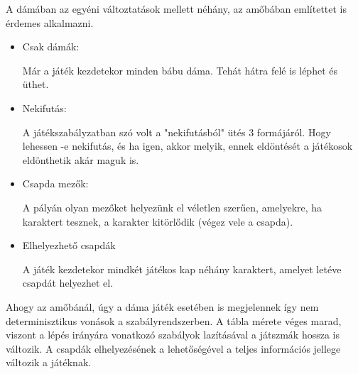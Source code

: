A dámában az egyéni változtatások mellett néhány, az amőbában említettet is érdemes alkalmazni.
\begin{itemize}
	\item Csak dámák:
	
	Már a játék kezdetekor minden bábu dáma. Tehát hátra felé is léphet és üthet.
	\item Nekifutás:
	
	A játékszabályzatban szó volt a "nekifutásból" ütés 3 formájáról. Hogy lehessen -e nekifutás, és ha igen, akkor melyik, ennek eldöntését a játékosok eldönthetik akár maguk is.
	
	\item Csapda mezők:
	
	A pályán olyan mezőket helyezünk el véletlen szerűen, amelyekre, ha karaktert tesznek, a karakter kitörlődik (végez vele a csapda).
	
	\item Elhelyezhető csapdák
	
	A játék kezdetekor mindkét játékos kap néhány karaktert, amelyet letéve csapdát helyezhet el.	
\end{itemize}

Ahogy az amőbánál, úgy a dáma játék esetében is megjelennek így nem determinisztikus vonások a szabályrendszerben. A tábla mérete véges marad, viszont a lépés irányára vonatkozó szabályok lazításával a játszmák hossza is változik. A csapdák elhelyezésének a lehetőségével a teljes információs jellege változik a játéknak.

